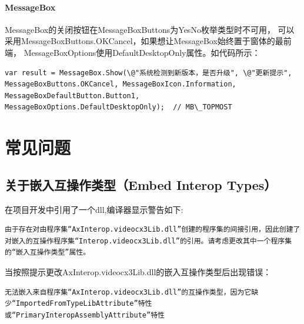 \documentclass{book}
\begin{document}
\paragraph{MessageBox}MessageBox的关闭按钮在MessageBoxButtons为YesNo枚举类型时不可用，
可以采用MessageBoxButtons.OKCancel，如果想让MessageBox始终置于窗体的最前端，
MessageBoxOptions使用DefaultDesktopOnly属性。如代码所示：

\begin{lstlisting}[language={[Sharp]C}]
var result = MessageBox.Show(\@"系统检测到新版本，是否升级", \@"更新提示", MessageBoxButtons.OKCancel, MessageBoxIcon.Information, MessageBoxDefaultButton.Button1, MessageBoxOptions.DefaultDesktopOnly);  // MB\_TOPMOST
\end{lstlisting}

\section{常见问题}

\subsection{关于嵌入互操作类型（Embed Interop Types）}

在项目开发中引用了一个dll,编译器显示警告如下:

\begin{lstlisting}
由于存在对由程序集“AxInterop.videocx3Lib.dll”创建的程序集的间接引用，因此创建了对嵌入的互操作程序集“Interop.videocx3Lib.dll”的引用。请考虑更改其中一个程序集的“嵌入互操作类型”属性。
\end{lstlisting}

当按照提示更改AxInterop.videocx3Lib.dll的嵌入互操作类型后出现错误：

\begin{lstlisting}
无法嵌入来自程序集“AxInterop.videocx3Lib.dll”的互操作类型，因为它缺少“ImportedFromTypeLibAttribute”特性或“PrimaryInteropAssemblyAttribute”特性
\end{lstlisting}
\end{document}
